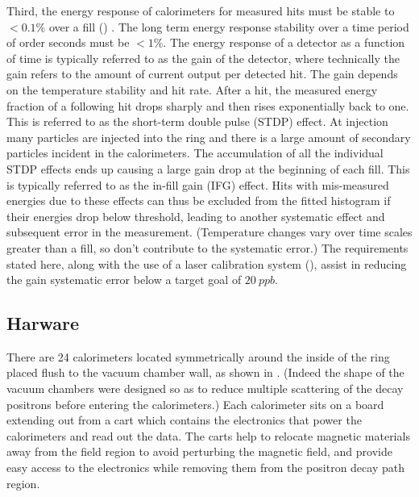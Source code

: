 Third, the energy response of calorimeters for measured hits must be stable to $< 0.1\%$ over a fill () \cite{TDR}. The long term energy response stability over a time period of order seconds must be $< 1\%$. The energy response of a detector as a function of time is typically referred to as the gain of the detector, where technically the gain refers to the amount of current output per detected hit. The gain depends on the temperature stability and hit rate. After a hit, the measured energy fraction of a following hit drops sharply and then rises exponentially back to one. This is referred to as the short-term double pulse (STDP) effect. At injection many particles are injected into the ring and there is a large amount of secondary particles incident in the calorimeters. The accumulation of all the individual STDP effects ends up causing a large gain drop at the beginning of each fill. This is typically referred to as the in-fill gain (IFG) effect. Hits with mis-measured energies due to these effects can thus be excluded from the fitted histogram if their energies drop below threshold, leading to another systematic effect and subsequent error in the \wa measurement. (Temperature changes vary over time scales greater than a fill, so don't contribute to the systematic error.) The requirements stated here, along with the use of a laser calibration system (), assist in reducing the gain systematic error below a target goal of $\SI{20}{ppb}$.



\subsection{Harware}


There are 24 calorimeters located symmetrically around the inside of the ring placed flush to the vacuum chamber wall, as shown in . (Indeed the shape of the vacuum chambers were designed so as to reduce multiple scattering of the decay positrons before entering the calorimeters.) Each calorimeter sits on a board extending out from a cart which contains the electronics that power the calorimeters and read out the data. The carts help to relocate magnetic materials away from the field region to avoid perturbing the magnetic field, and provide easy access to the electronics while removing them from the positron decay path region.


